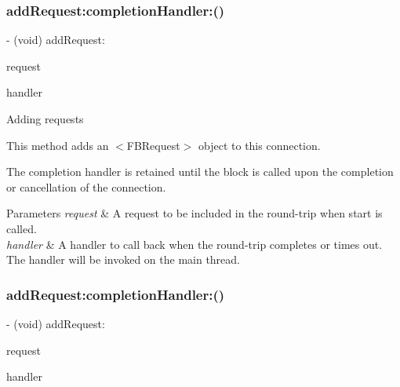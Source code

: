 \subsubsection{\texorpdfstring{add\+Request\+:completion\+Handler\+:()}{addRequest:completionHandler:()}\hspace{0.1cm}{\footnotesize\ttfamily [3/5]}}
{\footnotesize\ttfamily -\/ (void) add\+Request\+: \begin{DoxyParamCaption}\item[{(\hyperlink{interfaceFBRequest}{F\+B\+Request} $\ast$)}]{request }\item[{completionHandler:(F\+B\+Request\+Handler)}]{handler }\end{DoxyParamCaption}}

Adding requests

This method adds an $<$\+F\+B\+Request$>$ object to this connection.

The completion handler is retained until the block is called upon the completion or cancellation of the connection.


\begin{DoxyParams}{Parameters}
{\em request} & A request to be included in the round-\/trip when start is called. \\
\hline
{\em handler} & A handler to call back when the round-\/trip completes or times out. The handler will be invoked on the main thread. \\
\hline
\end{DoxyParams}
\mbox{\label{interfaceFBRequestConnection_a751b0603d2cc22be745f33a112681e0d}} 
\subsubsection{\texorpdfstring{add\+Request\+:completion\+Handler\+:()}{addRequest:completionHandler:()}\hspace{0.1cm}{\footnotesize\ttfamily [4/5]}}
{\footnotesize\ttfamily -\/ (void) add\+Request\+: \begin{DoxyParamCaption}\item[{(\hyperlink{interfaceFBRequest}{F\+B\+Request} $\ast$)}]{request }\item[{completionHandler:(F\+B\+Request\+Handler)}]{handler }\end{DoxyParamCaption}}

